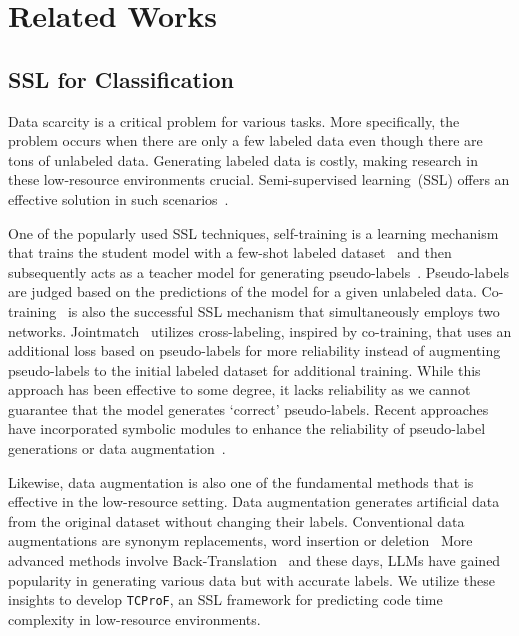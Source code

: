 \section{Related Works}
\subsection{SSL for Classification}
Data scarcity is a critical problem for various tasks.
More specifically, the problem occurs when there are only
a few labeled data even though there are tons of unlabeled data.
Generating labeled data is costly,
making research in these low-resource environments crucial.
Semi-supervised learning~(SSL) offers
an effective solution in such scenarios~\cite{SajjadiJT2016, XieDHLL2020, ChenZD2020, ChenHP2022, SohnBCZZ2020, ZhangWHW2021, WangCHH2022,ZouCZC23,Huang0Y0L23,NieDLWHZ24}.

One of the popularly used SSL techniques,
self-training is a learning mechanism that trains the student model with a few-shot labeled dataset~\cite{GengLLZJS19,BaoWCB20,ZhangB0CLXTCY21}
and then subsequently acts as a teacher model for generating pseudo-labels~\cite{Lee2013}.
Pseudo-labels are judged based on the predictions of the model for a given unlabeled data.
Co-training~\cite{BlumM98} is also the successful SSL mechanism
that simultaneously employs two networks.
Jointmatch~\cite{ZouC23} utilizes cross-labeling, inspired by co-training, that uses an additional loss based on pseudo-labels for more reliability
instead of augmenting pseudo-labels to the initial labeled dataset for additional training.
While this approach has been effective to some degree,
it lacks reliability as we cannot guarantee that the model generates `correct' pseudo-labels.
Recent approaches have incorporated symbolic modules
to enhance the reliability of pseudo-label generations or data augmentation~\cite{HahnCHLKH21,KimWOCH22}.

Likewise, data augmentation is also one of the fundamental methods that
is effective in the low-resource setting.
Data augmentation generates artificial data from the original dataset
without changing their labels.
Conventional data augmentations are synonym replacements, word insertion or deletion~\cite{WeiZ19}
More advanced methods involve Back-Translation~\cite{EdunovOAG18} and these days,
LLMs have gained popularity in generating various data but with accurate labels.
We utilize these insights to develop \texttt{TCProF},
an SSL framework for predicting code time complexity in low-resource environments.


